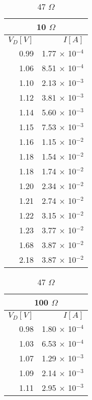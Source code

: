 \documentclass{ltjsarticle}
\begin{document}
\begin{table}[H]
  \begin{minipage}[t]{0.24\hsize}
    \vspace{0pt}
    \begin{tabular}{|r|r|}
      \hline
      \multicolumn{2}{|c|}{10 ${\Omega}$} \\ \hline
      ${V_D[V]}$ & ${I[A]}$ \\
      \hline
      0.99 & 1.77 ${\times}$ 10${^{-4}}$ \\
      1.06 & 8.51 ${\times}$ 10${^{-4}}$ \\
      1.10 & 2.13 ${\times}$ 10${^{-3}}$ \\
      1.12 & 3.81 ${\times}$ 10${^{-3}}$ \\
      1.14 & 5.60 ${\times}$ 10${^{-3}}$ \\
      1.15 & 7.53 ${\times}$ 10${^{-3}}$ \\
      1.16 & 1.15 ${\times}$ 10${^{-2}}$ \\
      1.18 & 1.54 ${\times}$ 10${^{-2}}$ \\
      1.18 & 1.74 ${\times}$ 10${^{-2}}$ \\
      1.20 & 2.34 ${\times}$ 10${^{-2}}$ \\
      1.21 & 2.74 ${\times}$ 10${^{-2}}$ \\
      1.22 & 3.15 ${\times}$ 10${^{-2}}$ \\
      1.23 & 3.77 ${\times}$ 10${^{-2}}$ \\
      1.68 & 3.87 ${\times}$ 10${^{-2}}$ \\
      2.18 & 3.87 ${\times}$ 10${^{-2}}$ \\ \hline
\end{tabular}
  \caption{47 ${\Omega}$}
\end{minipage}
\begin{minipage}[t]{0.24\hsize}
  \vspace{0pt}
  \begin{tabular}{|r|r|}
    \hline
    \multicolumn{2}{|c|}{100 ${\Omega}$} \\ \hline
    ${V_D[V]}$ & ${I[A]}$ \\
    \hline
    0.98 & 1.80 ${\times}$ 10${^{-4}}$ \\
    1.03 & 6.53 ${\times}$ 10${^{-4}}$ \\
    1.07 & 1.29 ${\times}$ 10${^{-3}}$ \\
    1.09 & 2.14 ${\times}$ 10${^{-3}}$ \\
    1.11 & 2.95 ${\times}$ 10${^{-3}}$ \\

\end{tabular}
\end{minipage}
\end{table}
\end{document}
